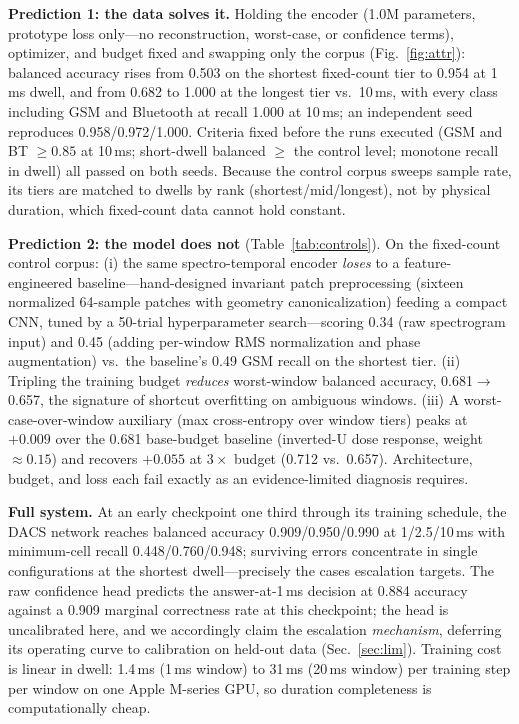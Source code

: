 \documentclass[10pt,twocolumn]{article}
\newcommand{\method}{DACS}
\begin{document}
\textbf{Prediction 1: the data solves it.} Holding the encoder (1.0M
parameters, prototype loss only---no reconstruction, worst-case, or
confidence terms), optimizer, and budget fixed and swapping only the
corpus (Fig.~\ref{fig:attr}): balanced accuracy rises from 0.503 on the
shortest fixed-count tier to 0.954 at 1\,ms dwell, and from 0.682 to
1.000 at the longest tier vs.\ 10\,ms, with every class including GSM and
Bluetooth at recall 1.000 at 10\,ms; an independent seed reproduces
0.958/0.972/1.000. Criteria fixed before the runs executed
(GSM and BT ${\ge}0.85$ at 10\,ms; short-dwell balanced ${\ge}$ the
control level; monotone recall in dwell) all passed on both seeds.
Because the control corpus sweeps sample rate, its tiers are matched to
dwells by rank (shortest/mid/longest), not by physical duration, which
fixed-count data cannot hold constant.

\textbf{Prediction 2: the model does not} (Table~\ref{tab:controls}). On
the fixed-count control corpus: (i) the same spectro-temporal encoder
\emph{loses} to a feature-engineered baseline---hand-designed invariant
patch preprocessing (sixteen normalized 64-sample patches with geometry
canonicalization) feeding a compact CNN, tuned by a 50-trial
hyperparameter search---scoring 0.34 (raw spectrogram input) and 0.45
(adding per-window RMS normalization and phase augmentation) vs.\ the
baseline's 0.49 GSM recall on the shortest tier. (ii) Tripling the
training budget \emph{reduces} worst-window balanced accuracy,
0.681${\to}$0.657, the signature of shortcut overfitting on ambiguous
windows. (iii) A worst-case-over-window auxiliary (max cross-entropy over
window tiers) peaks at $+0.009$ over the 0.681 base-budget baseline
(inverted-U dose response, weight ${\approx}0.15$) and recovers $+0.055$
at $3\times$ budget (0.712 vs.\ 0.657). Architecture, budget, and loss
each fail exactly as an evidence-limited diagnosis requires.

\textbf{Full system.} At an early checkpoint one third through its
training schedule, the \method{} network reaches balanced accuracy
0.909/0.950/0.990 at 1/2.5/10\,ms with minimum-cell recall
0.448/0.760/0.948; surviving errors concentrate in single configurations
at the shortest dwell---precisely the cases escalation targets. The raw
confidence head predicts the answer-at-1\,ms decision at 0.884 accuracy
against a 0.909 marginal correctness rate at this checkpoint; the head is
uncalibrated here, and we accordingly claim the escalation
\emph{mechanism}, deferring its operating curve to calibration on
held-out data (Sec.~\ref{sec:lim}). Training cost is linear in dwell:
1.4\,ms (1\,ms window) to 31\,ms (20\,ms window) per training step per
window on one Apple M-series GPU, so duration completeness is
computationally cheap.
\end{document}
